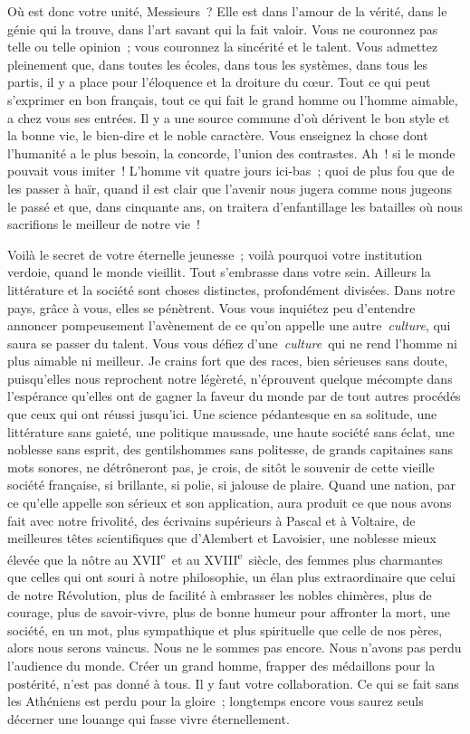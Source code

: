 \documentclass[french,twoside]{book} %
\newcommand\orgName[1]{#1}
\newcommand\persName[1]{#1}
\begin{document}
Où est donc votre unité, Messieurs ? Elle est dans l’amour de la vérité, dans le génie qui la trouve, dans l’art savant qui la fait valoir. Vous ne couronnez pas telle ou telle opinion ; vous couronnez la sincérité et le talent. Vous admettez pleinement que, dans toutes les écoles, dans tous les systèmes, dans tous les partis, il y a place pour l’éloquence et la droiture du cœur. Tout ce qui peut s’exprimer en bon français, tout ce qui fait le grand homme ou l’homme aimable, a chez vous ses entrées. Il y a une source commune d’où dérivent le bon style et la bonne vie, le bien-dire et le noble caractère. Vous enseignez la chose dont l’humanité a le plus besoin, la concorde, l’union des contrastes. Ah ! si le monde pouvait vous imiter ! L’homme vit quatre jours ici-bas ; quoi de plus fou que de les passer à haïr, quand il est clair que l’avenir nous jugera comme nous jugeons le passé et que, dans cinquante ans, on traitera d’enfantillage les batailles où nous sacrifions le meilleur de notre vie !\par
Voilà le secret de votre éternelle jeunesse ; voilà pourquoi votre institution verdoie, quand le monde vieillit. Tout s’embrasse dans votre sein. Ailleurs la littérature et la société sont choses distinctes, profondément divisées. Dans notre pays, grâce à vous, elles se pénètrent. Vous vous inquiétez peu d’entendre annoncer pompeusement l’avènement de ce qu’on appelle une autre {\itshape culture}, qui saura se passer du talent. Vous vous défiez d’une {\itshape culture} qui ne rend l’homme ni plus aimable ni meilleur. Je crains fort que des races, bien sérieuses sans doute, puisqu’elles nous reprochent notre légèreté, n’éprouvent quelque mécompte dans l’espérance qu’elles ont de gagner la faveur du monde par de tout autres procédés que ceux qui ont réussi jusqu’ici. Une science pédantesque en sa solitude, une littérature sans gaieté, une politique maussade, une haute société sans éclat, une noblesse sans esprit, des gentilshommes sans politesse, de grands capitaines sans mots sonores, ne détrôneront pas, je crois, de sitôt le souvenir de cette vieille société française, si brillante, si polie, si jalouse de plaire. Quand une nation, par ce qu’elle appelle son sérieux et son application, aura produit ce que nous avons fait avec notre frivolité, des écrivains supérieurs à {\persName Pascal} et à {\persName Voltaire}, de meilleures têtes scientifiques que {\persName d’Alembert} et {\persName Lavoisier}, une noblesse mieux élevée que la nôtre au XVII\textsuperscript{e} et au XVIII\textsuperscript{e} siècle, des femmes plus charmantes que celles qui ont souri à notre philosophie, un élan plus extraordinaire que celui de notre Révolution, plus de facilité à embrasser les nobles chimères, plus de courage, plus de savoir-vivre, plus de bonne humeur pour affronter la mort, une société, en un mot, plus sympathique et plus spirituelle que celle de nos pères, alors nous serons vaincus. Nous ne le sommes pas encore. Nous n’avons pas perdu l’audience du monde. Créer un grand homme, frapper des médaillons pour la postérité, n’est pas donné à tous. Il y faut votre collaboration. Ce qui se fait sans les {\orgName Athéniens} est perdu pour la gloire ; longtemps encore vous saurez seuls décerner une louange qui fasse vivre éternellement.\par
\end{document}
